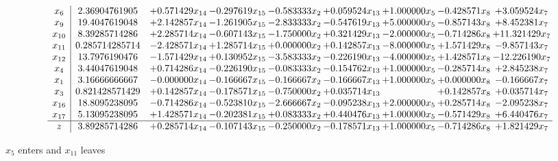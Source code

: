 \documentclass[10pt]{article}
\begin{document}
 \[\begin{array}{c| c c@{\hskip 2pt} c@{\hskip 2pt} c@{\hskip 2pt} c@{\hskip 2pt} c@{\hskip 2pt} c@{\hskip 2pt} c@{\hskip 2pt} }
 x_{6}   &  2.36904761905 & + 0.571429 x_{14} & -0.297619 x_{15} & -0.583333 x_{2} & + 0.059524 x_{13} & + 1.000000 x_{5} & -0.428571 x_{8} & + 3.059524 x_{7}\\
 x_{9}   &  19.4047619048 & + 2.142857 x_{14} & -1.261905 x_{15} & -2.833333 x_{2} & -0.547619 x_{13} & + 5.000000 x_{5} & -0.857143 x_{8} & + 8.452381 x_{7}\\
 x_{10}   &  8.39285714286 & + 2.285714 x_{14} & -0.607143 x_{15} & -1.750000 x_{2} & + 0.321429 x_{13} & -2.000000 x_{5} & -0.714286 x_{8} & + 11.321429 x_{7}\\
 x_{11}   &  0.285714285714 & -2.428571 x_{14} & + 1.285714 x_{15} & + 0.000000 x_{2} & + 0.142857 x_{13} & -8.000000 x_{5} & + 1.571429 x_{8} & -9.857143 x_{7}\\
 x_{12}   &  13.7976190476 & -1.571429 x_{14} & + 0.130952 x_{15} & -3.583333 x_{2} & -0.226190 x_{13} & -4.000000 x_{5} & + 1.428571 x_{8} & -12.226190 x_{7}\\
 x_{4}   &  3.44047619048 & + 0.714286 x_{14} & -0.226190 x_{15} & -0.083333 x_{2} & -0.154762 x_{13} & + 1.000000 x_{5} & -0.285714 x_{8} & + 2.845238 x_{7}\\
 x_{1}   &  3.16666666667 & -0.000000 x_{14} & -0.166667 x_{15} & -0.166667 x_{2} & -0.166667 x_{13} & + 1.000000 x_{5} & + 0.000000 x_{8} & -0.166667 x_{7}\\
 x_{3}   &  0.821428571429 & + 0.142857 x_{14} & -0.178571 x_{15} & -0.750000 x_{2} & + 0.035714 x_{13} &   & + 0.142857 x_{8} & + 0.035714 x_{7}\\
 x_{16}   &  18.8095238095 & -0.714286 x_{14} & -0.523810 x_{15} & -2.666667 x_{2} & -0.095238 x_{13} & + 2.000000 x_{5} & + 0.285714 x_{8} & -2.095238 x_{7}\\
 x_{17}   &  5.13095238095 & + 1.428571 x_{14} & -0.202381 x_{15} & + 0.083333 x_{2} & + 0.440476 x_{13} & + 1.000000 x_{5} & -0.571429 x_{8} & + 6.440476 x_{7}\\
\hline
z    &  3.89285714286 & + 0.285714 x_{14} & -0.107143 x_{15} & -0.250000 x_{2} & -0.178571 x_{13} & + 1.000000 x_{5} & -0.714286 x_{8} & + 1.821429 x_{7}\\
\end{array}\]


 $ x_{5} $ enters and $ x_{11} $ leaves 
\end{document}
